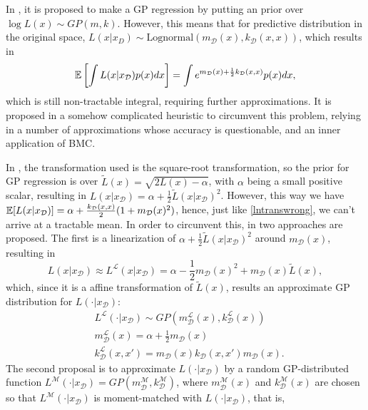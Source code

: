 In \cite{Osborne_2012}, it is proposed to make a GP regression by putting an prior over $\log L(x) \sim GP(m,k)$. However, this means that for predictive distribution in the original space, $L(x|x_{D}) \sim \text{Lognormal}(m_\mathcal{D}(x),k_\mathcal{D}(x,x))$, which results in
\begin{equation}\label{lntranswrong}
 {\mathbb E} \left[ \int L(x|x_\mathcal{D}) p(x) dx \right] = 
 \int e^{m_\mathcal{D}(x)+\frac{1}{2}k_\mathcal{D}(x,x)} p(x) dx,
\end{equation}
which is still non-tractable integral, requiring further approximations. It is proposed in \cite{OHagan_1992} a somehow complicated heuristic to circumvent this problem, relying in a number of approximations whose accuracy is questionable, and an inner application of BMC.

In \cite{Gunter_2014}, the transformation used is the square-root transformation, so the prior for GP regression is over $\tilde{L}(x) = \sqrt{2 L(x) - \alpha}$, with $\alpha$ being a small positive scalar, resulting in $L(x|x_\mathcal{D}) = \alpha + \frac{1}{2} \tilde{L}(x|x_\mathcal{D})^2$. However, this way we have ${\mathbb E}[L(x|x_\mathcal{D})] = \alpha + \frac{k_\mathcal{D}(x,x)}{2}(1+m_\mathcal{D}(x)^2)$, hence, just like \eqref{lntranswrong}, we can't arrive at a tractable mean. In order to circunvent this, in \cite{Gunter_2014} two approaches are proposed. The first is a linearization of $\alpha + \frac{1}{2} \tilde{L}(x|x_\mathcal{D})^2$ around $m_\mathcal{D}(x)$, resulting in 
\begin{equation}
 L(x|x_\mathcal{D}) \approx L^{\mathcal{L}}(x|x_\mathcal{D}) = \alpha - \frac{1}{2} m_\mathcal{D}(x)^2 + m_\mathcal{D}(x) \tilde{L}(x),
\end{equation}
which, since it is a affine transformation of $\tilde{L}(x)$, results an approximate GP distribution for $L(\cdot|x_\mathcal{D})$:
\begin{equation}\label{sqlinearization}
\begin{split}
 & L^{\mathcal{L}}(\cdot|x_\mathcal{D}) \sim GP(m_\mathcal{D}^\mathcal{L}(x),k_\mathcal{D}^\mathcal{L}(x)) \\
 & m_\mathcal{D}^\mathcal{L}(x) = \alpha + \frac{1}{2} m_\mathcal{D}(x) \\
 & k_\mathcal{D}^\mathcal{L}(x,x') = m_\mathcal{D}(x) k_\mathcal{D}(x,x') m_\mathcal{D}(x).
\end{split}
\end{equation}
The second proposal is to approximate $L(\cdot|x_\mathcal{D})$ by a random GP-distributed function $L^\mathcal{M}(\cdot|x_\mathcal{D}) = GP(m^\mathcal{M}_\mathcal{D},k^\mathcal{M}_\mathcal{D})$, where $m^\mathcal{M}_\mathcal{D}(x)$ and $k^\mathcal{M}_\mathcal{D}(x)$ are chosen so that $L^\mathcal{M}(\cdot|x_\mathcal{D})$ is moment-matched with $L(\cdot|x_\mathcal{D})$, that is,
